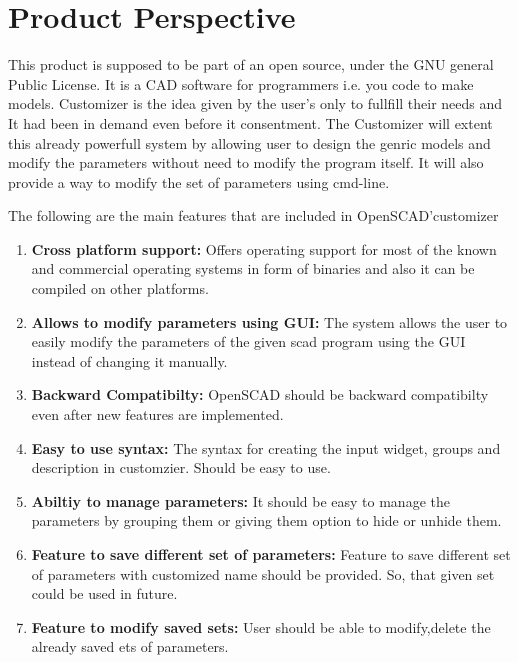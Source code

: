 \section{Product Perspective}
	
This product is supposed to be part of an open source, under the GNU general Public License. It is a CAD software for programmers i.e. you code to make models. Customizer is the idea given by the user's only to fullfill their needs and It had been in demand even before it consentment. The Customizer will extent this already powerfull system by allowing user to design the genric models and modify the parameters without need to modify the program itself. It will also provide a way to modify the set of parameters using cmd-line.
	
The following are the main features that are included in OpenSCAD'customizer

\begin{enumerate}
	\item \textbf{Cross platform support:} Offers operating support for most of the known and commercial operating systems in form of binaries and also it can be compiled on other platforms.
	
	\item \textbf{Allows to modify parameters using GUI:} The system allows the user to easily modify the parameters of the given scad program using the GUI instead of changing it 
	manually.
	
	\item \textbf{Backward Compatibilty:} OpenSCAD should be backward compatibilty even after new features are implemented.
	
	\item \textbf{Easy to use syntax:} The syntax for creating the input widget, groups and description in customzier. Should be easy to use.
	
	\item \textbf{Abiltiy to manage parameters:} It should be easy to manage the parameters by grouping them or giving them option to hide or unhide them.
	
	\item \textbf{Feature to save different set of parameters:} Feature to save different set of parameters with customized name should be provided. So, that given set could be used in future.
	
	\item \textbf{Feature to modify saved sets:} User should be able to modify,delete the already saved ets of parameters.
	
\end{enumerate}	

